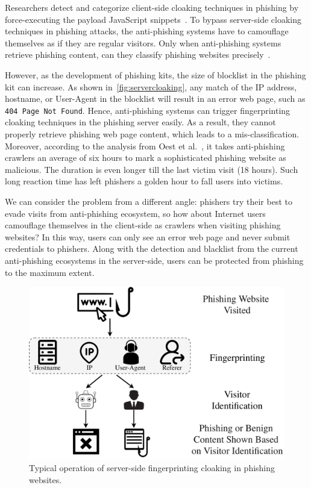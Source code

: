 Researchers detect and categorize client-side cloaking techniques in phishing by force-executing the payload JavaScript snippets~\cite{zhang2021crawlphish}.
To bypass server-side cloaking techniques in phishing attacks, the anti-phishing systems have to camouflage themselves as if they are regular visitors.
Only when anti-phishing systems retrieve phishing content, can they classify phishing websites precisely~\cite{xiang2011cantina+,whittaker2010large,smartscreen}.

However, as the development of phishing kits, the size of blocklist in the phishing kit can increase.
As shown in~\autoref{fig:servercloaking}, any match of the IP address, hostname, or User-Agent in the blocklist will result in an error web page, such as \texttt{404 Page Not Found}.
Hence, anti-phishing systems can trigger fingerprinting cloaking techniques in the phishing server easily.
As a result, they cannot properly retrieve phishing web page content, which leads to a mis-classification.
Moreover, according to the analysis from Oest et al.~\cite{oest2020sunrise}, it takes anti-phishing crawlers an average of six hours to mark a sophisticated phishing website as malicious.
The duration is even longer till the last victim visit (18 hours).
Such long reaction time has left phishers a golden hour to fall users into victims.

We can consider the problem from a different angle: phishers try their best to evade visits from anti-phishing ecosystem, so how about Internet users camouflage themselves in the client-side as crawlers when visiting phishing websites?
In this way, users can only see an error web page and never submit credentials to phishers.
Along with the detection and blacklist from the current anti-phishing ecosystems in the server-side,
users can be protected from phishing to the maximum extent.




\begin{figure}
\centering
\includegraphics[width=.9\linewidth]{figs/fp_cloaking.pdf}
\caption{Typical operation of server-side fingerprinting cloaking in phishing websites.}
\label{fig:fp_cloaking}
\end{figure}